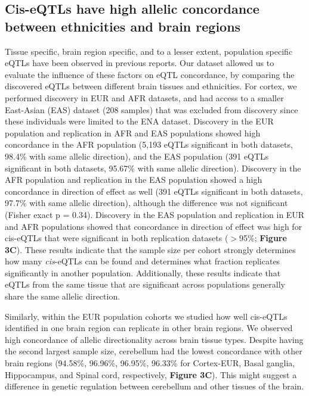 \subsection{Cis-eQTLs have high allelic concordance between ethnicities and brain regions }
Tissue specific\cite{aguetGeneticEffectsGene2017}, brain region specific\cite{siebertsLargeEQTLMetaanalysis2020}, and to a lesser extent, population specific\cite{shangGeneticArchitectureGene2020} eQTLs have been observed in previous reports. Our dataset allowed us to evaluate the influence of these factors on eQTL concordance, by comparing the discovered eQTLs between different brain tissues and ethnicities. For cortex, we performed discovery in EUR and AFR datasets, and had access to a smaller East-Asian (EAS) dataset (208 samples) that was excluded from discovery since these individuals were limited to the ENA dataset. Discovery in the EUR population and replication in AFR and EAS populations showed high concordance in the AFR population (5,193 eQTLs significant in both datasets, 98.4\% with same allelic direction), and the EAS population (391 eQTLs significant in both datasets, 95.67\% with same allelic direction). Discovery in the AFR population and replication in the EAS population showed a high concordance in direction of effect as well (391 eQTLs significant in both datasets, 97.7\% with same allelic direction), although the difference was not significant (Fisher exact p = 0.34). Discovery in the EAS population and replication in EUR and AFR populations showed that concordance in direction of effect was high for cis-eQTLs that were significant in both replication datasets ($>$95\%; \textbf{Figure 3C}). These results indicate that the sample size per cohort strongly determines how many \emph{cis}-eQTLs can be found and determines what fraction replicates significantly in another population. Additionally, these results indicate that eQTLs from the same tissue that are significant across populations generally share the same allelic direction. 

Similarly, within the EUR population cohorts we studied how well cis-eQTLs identified in one brain region can replicate in other brain regions. We observed high concordance of allelic directionality across brain tissue types. Despite having the second largest sample size, cerebellum had the lowest concordance with other brain regions (94.58\%, 96.96\%, 96.95\%, 96.33\% for Cortex-EUR, Basal ganglia, Hippocampus, and Spinal cord, respectively, \textbf{Figure 3C}). This might suggest a difference in genetic regulation between cerebellum and other tissues of the brain.  

